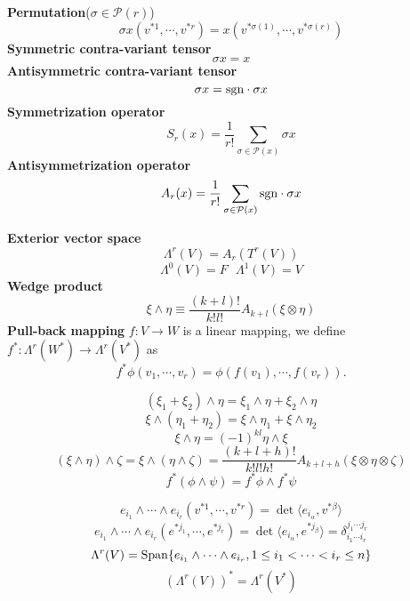 \begin{newdef}
\textbf{Permutation}($\sigma \in \mathcal{P}(r)$)
\[\sigma x(v^{*1},\cdots,v^{*r})=x(v^{*\sigma(1)},\cdots,v^{*\sigma(r)})\]
\textbf{Symmetric contra-variant tensor}
\[\sigma x =x\]
\textbf{Antisymmetric contra-variant tensor}
\[\sigma x ={\rm sgn } \cdot \sigma x\]
\textbf{Symmetrization operator}
\[S_r(x) = \frac{1}{r!} \sum_{\sigma \in \mathcal{P}(x)} \sigma x\]
\textbf{Antisymmetrization operator}
\[A_r(x) = \frac{1}{r!} \sum_{\sigma \in \mathcal{P}(x)} {\rm sgn }\cdot \sigma x\]
\end{newdef}

\begin{newdef}
\textbf{Exterior vector space}
\[\Lambda^r(V) = A_r(T^r(V))\]
\[\Lambda^0(V)=F \ \ \ \Lambda^1(V)=V\]
\textbf{Wedge product}
\[\xi \wedge \eta \equiv \frac{(k+l)!}{k!l!}A_{k+l}(\xi \otimes \eta)\]
\textbf{Pull-back mapping}
$f:V \to W$ is a linear mapping, we define $f^*:\Lambda^r(W^*) \to \Lambda^r(V^*)$ as
\[f^* \phi(v_1,\cdots,v_r) = \phi(f(v_1),\cdots,f(v_r)).\]
\end{newdef}

\begin{newprop}
\[(\xi_1+\xi_2) \wedge \eta = \xi_1 \wedge \eta + \xi_2 \wedge \eta\]
\[\xi \wedge (\eta_1+\eta_2) = \xi \wedge \eta_1 + \xi \wedge \eta_2\]
\[\xi \wedge \eta = (-1)^{kl} \eta \wedge \xi\]
\[(\xi \wedge \eta) \wedge \zeta = \xi \wedge (\eta \wedge \zeta) = \frac{(k+l+h)!}{k!l!h!}A_{k+l+h}(\xi \otimes \eta \otimes \zeta)\]
\[f^*(\phi \wedge \psi) = f^*\phi \wedge f^*\psi\]
\end{newprop}

\begin{newprop}
\[e_{i_1} \wedge \cdots \wedge e_{i_r}(v^{*1},\cdots,v^{*r}) = \det \langle e_{i_{\alpha}},v^{*\beta} \rangle\]
\[e_{i_1} \wedge \cdots \wedge e_{i_r}(e^{*j_1},\cdots,e^{*j_r}) = \det \langle e_{i_{\alpha}},e^{*j_{\beta}} \rangle = \delta^{j_1 \cdots j_r}_{i_1 \cdots i_r}\]
\[\Lambda^r(V) = {\rm Span }\{e_{i_1} \wedge \cdots \wedge e_{i_r},1\leq i_1 < \cdots < i_r \leq n  \}\]
\[(\Lambda^r(V))^* = \Lambda^r(V^*)\]
\end{newprop}

